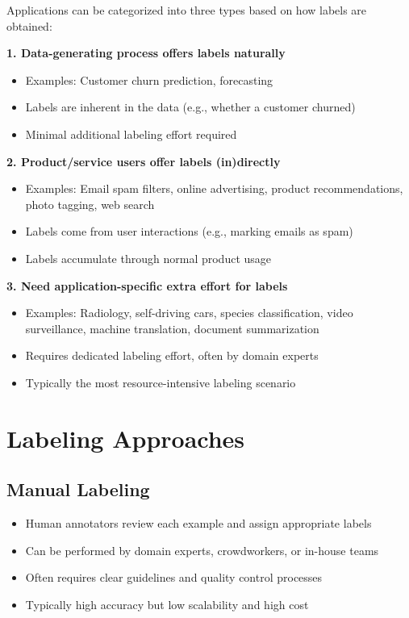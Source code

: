 \documentclass[12pt]{article}
\begin{document}
\begin{tcolorbox}[colback=blue!5!white,colframe=blue!75!black,title={Application Categories by Labeling Source}]
Applications can be categorized into three types based on how labels are obtained:

\textbf{1. Data-generating process offers labels naturally}
\begin{itemize}
    \item Examples: Customer churn prediction, forecasting
    \item Labels are inherent in the data (e.g., whether a customer churned)
    \item Minimal additional labeling effort required
\end{itemize}

\textbf{2. Product/service users offer labels (in)directly}
\begin{itemize}
    \item Examples: Email spam filters, online advertising, product recommendations, photo tagging, web search
    \item Labels come from user interactions (e.g., marking emails as spam)
    \item Labels accumulate through normal product usage
\end{itemize}

\textbf{3. Need application-specific extra effort for labels}
\begin{itemize}
    \item Examples: Radiology, self-driving cars, species classification, video surveillance, machine translation, document summarization
    \item Requires dedicated labeling effort, often by domain experts
    \item Typically the most resource-intensive labeling scenario
\end{itemize}
\end{tcolorbox}

\section{Labeling Approaches}

\subsection{Manual Labeling}
\begin{itemize}
    \item Human annotators review each example and assign appropriate labels
    \item Can be performed by domain experts, crowdworkers, or in-house teams
    \item Often requires clear guidelines and quality control processes
    \item Typically high accuracy but low scalability and high cost
\end{itemize}
\end{document}
